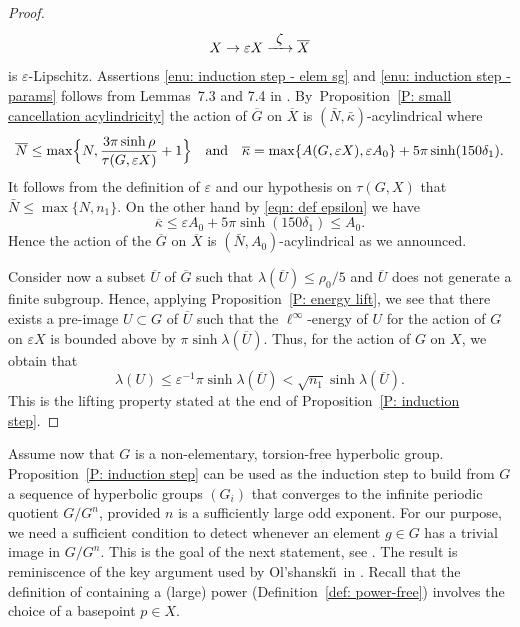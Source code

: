 \documentclass[JEP,XML,SOM,Unicode, NoEqCountersInSection,published]{cedram}
\newcommand\To[1]{\mathchoice{\xrightarrow{\textstyle\kern4pt#1\kern3pt}}{\stackrel{#1}{\longrightarrow}}{}{}}
\theoremstyle{plain}
\theoremstyle{definition}
\newcommand{\q}[1]{\overline{#1}}
\begin{document}
\begin{proof}
\begin{equation*}
X \to \varepsilon X \To\zeta \q X
\end{equation*}
is $\varepsilon$-Lipschitz.
Assertions \eqref{enu: induction step - elem sg} and \eqref{enu: induction step - params} follows from Lemmas~7.3 and 7.4 in \cite{coulon_geometry_2014}.
By~Proposition~\ref{P: small cancellation acylindricity} the action of $\q G$ on $\q X$ is $(\bar N, \bar \kappa)$-acylindrical where
\begin{equation*}
\q N \leq \max\Bigl\{N, \frac{3\pi\sinh\rho}{\tau(G,\varepsilon X)}+1\Bigr\}
\quad \text{and} \quad
\q \kappa = \max \{A(G, \varepsilon X), \varepsilon A_0\} + 5\pi \sinh (150\delta_1).
\end{equation*}
It follows from the definition of $\varepsilon$ and our hypothesis on $\tau(G,X)$ that $\bar N \leq \max\{ N, n_1\}$.
On the other hand by \eqref{eqn: def epsilon} we have
\begin{equation*}
\q \kappa \leq \varepsilon A_0 + 5\pi \sinh (150\delta_1) \leq A_0.
\end{equation*}
Hence the action of the $\q G$ on $\q X$ is $(\bar N, A_0)$-acylindrical as we announced.

Consider now a subset $\q U$ of $\q G$ such that $\lambda(\q U) \leq \rho_0 /5$ and $\q U$ does not generate a finite subgroup.
Hence, applying Proposition~\ref{P: energy lift}, we see that there exists a pre-image $U \subset G$ of $\q U$ such that the $\ell^{\infty}$-energy of $U$ for the action of $G$ on $\varepsilon X$ is bounded above by $\pi \sinh \lambda(\q U)$.
Thus, for the action of $G$ on $X$, we obtain that
\[
\lambda (U)\leqslant \varepsilon^{-1} \pi \sinh \lambda(\q U) < \sqrt{n_1} \sinh \lambda(\q U). 
\]
This is the lifting property stated at the end of Proposition~\ref{P: induction step}.
\end{proof}

Assume now that $G$ is a non-elementary, torsion-free hyperbolic group.
Proposition~\ref{P: induction step} can be used as the induction step to build from $G$ a sequence of hyperbolic groups $(G_i)$ that converges to the infinite periodic quotient $G/G^n$, provided $n$ is a sufficiently large odd exponent.
For our purpose, we need a sufficient condition to detect whenever an element $g \in G$ has a trivial image in $G/G^n$.
This is the goal of the next statement, see \cite[Th.\,4.13]{coulon_detecting_2018}.
The result is reminiscence of the key argument used by Ol'shanski\u\i\ in \cite[\S10]{olshanskii_periodic_1991}.
Recall that the definition of containing a (large) power (Definition~\ref{def: power-free}) involves the choice of a basepoint $p \in X$.
\end{document}
